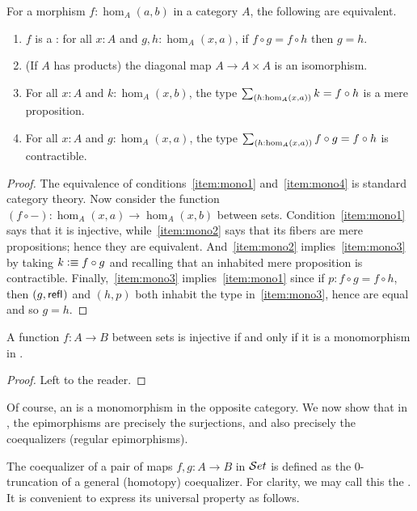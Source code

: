 \begin{lem}\label{thm:mono}
  For a morphism $f:\hom_A(a,b)$ in a category $A$, the following are equivalent.
  \begin{enumerate}
  \item $f$ is a : for all $x:A$ and ${g,h:\hom_A(x,a)}$, if $f\circ g = f\circ h$ then $g=h$.\label{item:mono1}
  \item (If $A$ has products) the diagonal map $A\to A\times A$ is an isomorphism.\label{item:mono4}
  \item For all $x:A$ and $k:\hom_A(x,b)$, the type $\sm{h:\hom_A(x,a)} k = f\circ h$ is a mere proposition.\label{item:mono2}
  \item For all $x:A$ and ${g:\hom_A(x,a)}$, the type $\sm{h:\hom_A(x,a)} f\circ g = f\circ h$ is contractible.\label{item:mono3}
  \end{enumerate}
\end{lem}
\begin{proof}
  The equivalence of conditions~\ref{item:mono1} and~\ref{item:mono4} is standard category theory.
  Now consider the function $(f\circ -):\hom_A(x,a) \to \hom_A(x,b)$ between sets.
  Condition~\ref{item:mono1} says that it is injective, while~\ref{item:mono2} says that its fibers are mere propositions; hence they are equivalent.
  And~\ref{item:mono2} implies~\ref{item:mono3} by taking $k\vcentcolon\equiv f\circ g$ and recalling that an inhabited mere proposition is contractible.
  Finally,~\ref{item:mono3} implies~\ref{item:mono1} since if $p:f\circ g= f\circ h$, then $(g,\mathsf{refl}_{})$ and $(h,p)$ both inhabit the type in~\ref{item:mono3}, hence are equal and so $g=h$.
\end{proof}

\begin{lem}
  A function $f:A\to B$ between sets is injective if and only if it is a monomorphism in \uset.
\end{lem}
\begin{proof}
  Left to the reader.
\end{proof}

Of course, an  is a monomorphism in the opposite category.
We now show that in \uset, the epimorphisms are precisely the surjections, and also precisely the coequalizers (regular epimorphisms).

The coequalizer of a pair of maps $f,g:A\to B$ in $\mathcal{S}et$ is defined as the 0-truncation of a general (homotopy) coequalizer.
For clarity, we may call this the .
It is convenient to express its universal property as follows.

